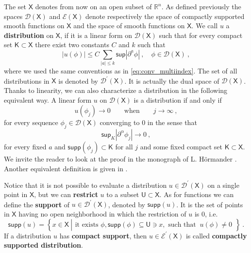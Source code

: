 \documentclass[11pt]{book}
\newcommand{\supp}{\mathsf{supp}}
\renewcommand{\sup}{\mathsf{sup}}
\newcommand{\abs}[1]{\left|#1\right|}
\newcommand{\Dcal}{\mathcal{D}}
\newcommand{\Ecal}{\mathcal{E}}
\newcommand{\Rbb}{\mathbb{R}}
\newcommand{\Ksf}{\mathsf{K}}
\newcommand{\Usf}{\mathsf{U}}
\newcommand{\Xsf}{\mathsf{X}}
\theoremstyle{break}
\begin{document}
The set $\Xsf$ denotes from now on an open subset of $\Rbb^n$. As defined previously the spaces $\Dcal(\Xsf)$ and $\Ecal(\Xsf)$ denote respectively the space of compactly supported smooth functions on $\Xsf$ and the space of smooth functions on $\Xsf$. We call $u$ a \textbf{distribution} on $\Xsf$, if it is a linear form on $\Dcal(\Xsf)$ such that for every compact set $\Ksf \subset \Xsf$ there exist two constants $C$ and $k$ such that
%
\begin{equation*}
\abs{u(\phi)} \leq C \sum_{\abs{a} \leq k} \sup \abs{\partial^a \phi} \ , \quad \phi \in \Dcal(\Xsf) \ ,
\end{equation*}
%
where we used the same conventions as in \eqref{eq:conv_multiindex}. The set of all distributions in $\Xsf$ is denoted by $\Dcal^\prime(\Xsf)$. It is actually the dual space of $\Dcal(\Xsf)$. Thanks to linearity, we can also characterize a distribution in the following equivalent way. A linear form $u$ on $\Dcal(\Xsf)$ is a distribution if and only if 
%
\begin{equation*}
u(\phi_j) \to 0 \qquad  \mbox{when} \qquad j \to \infty \ ,
\end{equation*}
%
for every sequence $\phi_j \in \Dcal(\Xsf)$ converging to $0$ in the sense that
%
\begin{equation*}
\sup_{K}\abs{\partial^\alpha\phi_j} \to 0 \ ,
\end{equation*}
%
for every fixed $a$ and $\supp(\phi_j) \subset \Ksf$ for all $j$ and some fixed compact set $\Ksf \subset \Xsf$. We invite the reader to look at the proof in the monograph of L. Hörmander \cite[theorem 2.4]{HORMANDER_1990}. Another equivalent definition is given in \cite[theorem 2.15]{HORMANDER_1990}.


Notice that it is not possible to evaluate a distribution $u \in \Dcal^\prime(\Xsf)$ on a single point in $\Xsf$, but we can \textbf{restrict} $u$ to a subset $\Usf \subset \Xsf$. As for functions we can define the \textbf{support} of $u \in \Dcal^\prime(\Xsf)$, denoted by $\supp(u)$. It is the set of points in $\Xsf$ having no open neighborhood in which the restriction of $u$ is $0$, i.e. 
%
\begin{equation}
\supp(u) = \left\{ x \in \Xsf \ \left|
\begin{array}{l}
\mbox{it exists \ } \phi, \supp(\phi) \subseteq \Usf \ni x , \mbox{ such that } \ u(\phi) \neq 0
\end{array}
\right. \right\} \ .
\label{eq:supp_distribution}
\end{equation}
%
If a distribution $u$ has \textbf{compact support}, then $u \in \Ecal^\prime(\Xsf)$ is called \textbf{compactly supported distribution}. 
\end{document}
